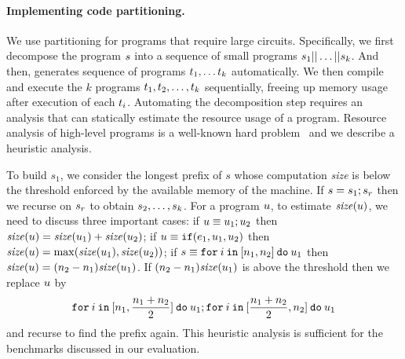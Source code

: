 \paragraph{Implementing code partitioning.}
We use partitioning for programs that require large
circuits. Specifically, we first decompose the program
$s$ into a sequence of small programs
$s_1||\dots||s_k$. And then, \tool generates
sequence of programs $t_1,\dots t_k$ automatically. We then
compile and execute the $k$ programs
$t_1,t_2,\ldots,t_k$ sequentially, freeing up memory
usage after execution of each $t_i$.
Automating the  decomposition step requires an analysis that can 
statically estimate the resource usage of a \tool program.
Resource analysis of high-level programs is a well-known hard problem~\cite{raml}
and we describe a heuristic analysis.

To build $s_1$, we consider the longest
prefix of $s$ whose computation {\it size} is below the threshold enforced by the available memory of the machine.
If $s = s_1; s_r$ then we recurse on $s_r$ to obtain $s_2,\ldots,s_k$.
For a program $u$, to estimate ${\it size}(u)$, we need to discuss three important cases: if $u\equiv u_1;u_2$
then ${\it size}(u)={\it size}(u_1)+{\it size}(u_2)$; if $u\equiv{\ensuremath{\mathtt{if}}}({e_1}, {u_1}, {u_2})$ then ${\it size}(u)=\max({\it size}(u_1),{\it size}(u_2))$; if $s\equiv{\ensuremath{\mathtt{for}}}\:{i}\:{\mathtt{in}}\:[{n_1}, {n_2}]\:{\mathtt{do}}\:{u_1}$ then
${\it size}(u)=(n_2-n_1){\it size}(u_1)$. If $(n_2-n_1){\it size}(u_1)$ is above the threshold then
we replace $u$ by 
\[{\mathtt{for}}\:{i}\:{\mathtt{in}}\:[{n_1}, {\frac{n_1+n_2}{2}}]\:{\mathtt{do}}\:{u_1}; {\mathtt{for}}\:{i}\:{\mathtt{in}}\:[{\frac{n_1+n_2}{2}}, {n_2}]\:{\mathtt{do}}\:{u_1}\]
 and recurse to find the prefix again.
This heuristic analysis is sufficient for the benchmarks discussed in our evaluation.
 


